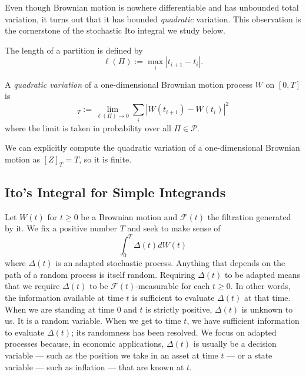 \documentclass[\topdir/lecture\_notes.tex]{subfiles}
\begin{document}
Even though Brownian motion is nowhere differentiable and has unbounded total variation, it turns out that it has bounded \textit{quadratic} variation. This observation is the cornerstone of the stochastic Ito integral we study below.

The length of a partition is defined by
\begin{equation*}
\ell(\Pi):=\max _{i}\left|t_{i+1}-t_{i}\right|.
\end{equation*}
\begin{defn}\label{defn:quadratic_variation}
A \emph{quadratic variation} of a one-dimensional Brownian motion process \(W\) on \([0, T]\) is
\begin{equation*}
[W,W]_{T} := \lim _{\ell(\Pi) \rightarrow 0} \sum_{i}\left|W(t_{i+1})-W(t_{i})\right|^{2}
\end{equation*}
where the limit is taken in probability over all \(\Pi\in\mathcal{P}\).
\end{defn}
We can explicitly compute the quadratic variation of a one-dimensional Brownian motion as \([Z]_{T}=T\), so it is finite. 

\subsection{Ito's Integral for Simple Integrands}
Let \(W(t)\) for \(t\geq 0\) be a Brownian motion and \(\mathcal{F}(t)\) the filtration generated by it. We fix a positive number \(T\) and seek to make sense of
\begin{equation}
\int_{0}^{T} \Delta(t) d W(t) \label{eq:ito_integral}
\end{equation}
where \(\Delta(t)\) is an adapted stochastic process. Anything that depends on the path of a random process is itself random. Requiring \(\Delta(t)\) to be adapted means that we require \(\Delta(t)\) to be \(\mathcal{F}(t)\)-measurable for each \(t \geq 0\). In other words, the information available at time \(t\) is sufficient to evaluate \(\Delta(t)\) at that time. When we are standing at time \(0\) and \(t\) is strictly positive, \(\Delta(t)\) is unknown to us. It is a random variable. When we get to time \(t\), we have sufficient information to evaluate \(\Delta(t)\); its randomness has been resolved. We focus on adapted processes because, in economic applications, \(\Delta(t)\) is usually be a decision variable --- such as the position we take in an asset at time \(t\) --- or a state variable --- such as inflation --- that are known at \(t\).
\end{document}
